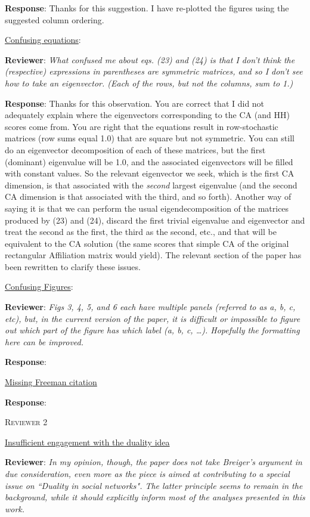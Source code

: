 \documentclass{article}
\begin{document}
\textbf{Response}: Thanks for this suggestion. I have re-plotted the figures using the suggested column ordering. 

\underline{Confusing equations}:

\textbf{Reviewer}: \textit{What confused me about eqs. (23) and (24) is that I don't think the (respective) expressions in parentheses are symmetric matrices, and so I don't see how to take an eigenvector. (Each of the rows, but not the columns, sum to 1.)}

\textbf{Response}: Thanks for this observation. You are correct that I did not adequately explain where the eigenvectors corresponding to the CA (and HH) scores come from. You are right that the equations result in row-stochastic matrices (row sums equal 1.0) that are square but not symmetric. You can still do an eigenvector decomposition of each of these matrices, but the first (dominant) eigenvalue will be 1.0, and the associated eigenvectors will be filled with constant values. So the relevant eigenvector we seek, which is the first CA dimension, is that associated with the \textit{second} largest eigenvalue (and the second CA dimension is that associated with the third, and so forth). Another way of saying it is that we can perform the usual eigendecomposition of the matrices produced by (23) and (24), discard the first trivial eigenvalue and eigenvector and treat the second as the first, the third as the second, etc., and that will be equivalent to the CA solution (the same scores that simple CA of the original rectangular Affiliation matrix would yield). The relevant section of the paper has been rewritten to clarify these issues. 

\underline{Confusing Figures}:

\textbf{Reviewer}: \textit{Figs 3, 4, 5, and 6 each have multiple panels (referred to as a, b, c, etc), but, in the current version of the paper, it is difficult or impossible to figure out which part of the figure has which label (a, b, c, …). Hopefully the formatting here can be improved.}

\textbf{Response}: 


\underline{Missing Freeman citation}

\textbf{Response}:

\newpage
\textsc{Reviewer 2}

\underline{Insufficient engagement with the duality idea}

\textbf{Reviewer}: \textit{In my opinion, though, the paper does not take Breiger's argument in due consideration, even more as the piece is aimed at contributing to a special issue on ``Duality in social networks". The latter principle seems to remain in the background, while it should explicitly inform most of the analyses presented in this work.}
\end{document}

